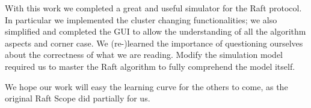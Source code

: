 
With this work we completed a great and useful simulator for the Raft protocol.
In particular we implemented the cluster changing functionalities;
we also simplified and completed the GUI to allow the understanding of all
the algorithm aspects and corner case.
We (re-)learned the importance of questioning ourselves about the correctness
of what we are reading.
Modify the simulation model required us to master the Raft algorithm to fully
comprehend the model itself.

We hope our work will easy the learning curve for the others to come,
as the original Raft Scope did partially for us.
